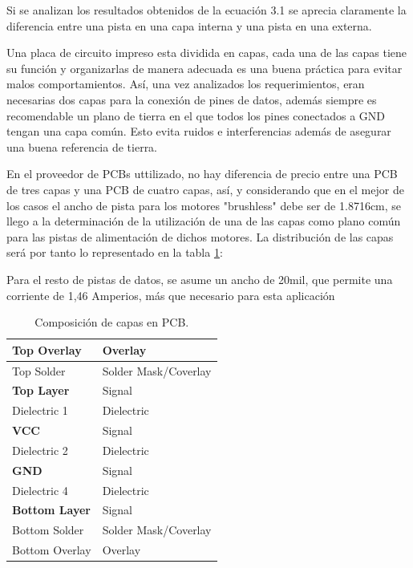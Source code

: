Si se analizan los resultados obtenidos de la ecuación 3.1 se aprecia claramente la diferencia entre una pista en una capa interna y una pista en una externa. \newline

Una placa de circuito impreso esta dividida en capas, cada una de las capas tiene su función y organizarlas de manera adecuada es una buena práctica para evitar malos comportamientos. Así, una vez analizados los requerimientos, eran necesarias dos capas para la conexión de pines de datos, además siempre es recomendable un plano de tierra en el que todos los pines conectados a GND tengan una capa común. Esto evita ruidos e interferencias además de asegurar una buena referencia de tierra. \newline

En el proveedor de PCBs uttilizado, no hay diferencia de precio entre una PCB de tres capas y una PCB de cuatro capas, así, y considerando que en el mejor de los casos el ancho de pista para los motores "brushless" debe ser de 1.8716cm, se llego a la determinación de la utilización de una de las capas como plano común para las pistas de alimentación de dichos motores. La distribución de las capas será por tanto lo representado en la tabla \ref{tabla:layers_altium}: 

Para el resto de pistas de datos, se asume un ancho de 20mil, que permite una corriente de 1,46 Amperios, más que necesario para esta aplicación


\renewcommand\tablename{Tabla}
\begin{table}[H]
	\centering
	
	\begin{tabular}{|l|l|}
		\hline
		Top Overlay           & Overlay              \\ \hline
		Top Solder            & Solder Mask/Coverlay \\ \hline
		\textbf{Top Layer}    & Signal               \\ \hline
		Dielectric 1          & Dielectric           \\ \hline
		\textbf{VCC}          & Signal               \\ \hline
		Dielectric 2          & Dielectric           \\ \hline
		\textbf{GND}          & Signal               \\ \hline
		Dielectric 4          & Dielectric           \\ \hline
		\textbf{Bottom Layer} & Signal               \\ \hline
		Bottom Solder         & Solder Mask/Coverlay \\ \hline
		Bottom Overlay        & Overlay              \\ \hline
	\end{tabular}
	\caption{Composición de capas en PCB.}
	\label{tabla:layers_altium}
\end{table}




